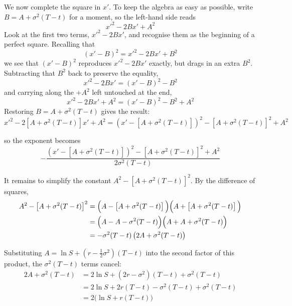 \documentclass[a4paper,12pt]{article}
\numberwithin{equation}{section}
\begin{document}
We now complete the square in $x'$. To keep the algebra as easy as possible, write
$B = A + \sigma^2(T-t)$ for a moment, so the left-hand side reads
\begin{equation}\label{eq:i1-csq-lhs}
  {x'}^2 - 2Bx' + A^2 
\end{equation}
Look at the first two terms, ${x'}^2 - 2Bx'$, and recognise them as the beginning
of a perfect square. Recalling that
\begin{equation}\label{eq:i1-csq-square}
  (x' - B)^2 = {x'}^2 - 2Bx' + B^2 
\end{equation}
we see that $(x' - B)^2$ reproduces ${x'}^2 - 2Bx'$ exactly, but drags in an extra
$B^2$. Subtracting that $B^2$ back to preserve the equality,
\begin{equation}\label{eq:i1-csq-shift}
  {x'}^2 - 2Bx' = (x' - B)^2 - B^2 
\end{equation}
and carrying along the $+A^2$ left untouched at the end,
\begin{equation}\label{eq:i1-csq-const}
  {x'}^2 - 2Bx' + A^2 = (x' - B)^2 - B^2 + A^2 
\end{equation}
Restoring $B = A + \sigma^2(T-t)$ gives the result:
\begin{equation}\label{eq:i1-csq-final}
  {x'}^2 - 2\left[A + \sigma^2(T-t)\right]x' + A^2
  = \left(x' - \left[A + \sigma^2(T-t)\right]\right)^2 - \left[A + \sigma^2(T-t)\right]^2 + A^2 
\end{equation}

so the exponent becomes
\begin{equation}\label{eq:i1-exp-6}
  -\frac{\left(x' - \left[A + \sigma^2(T-t)\right]\right)^2 - \left[A + \sigma^2(T-t)\right]^2 + A^2}{2\sigma^2(T-t)} 
\end{equation}

It remains to simplify the constant $A^2 - \left[A + \sigma^2(T-t)\right]^2$. By the
difference of squares,
\begin{align}
  A^2 - \left[A + \sigma^2(T-t)\right]^2
  &= \Big(A - \left[A + \sigma^2(T-t)\right]\Big)\Big(A + \left[A + \sigma^2(T-t)\right]\Big) \notag\\
  &= \Big(A - A - \sigma^2(T-t)\Big)\Big(A + A + \sigma^2(T-t)\Big) \notag\\
  &= -\sigma^2(T-t)\left(2A + \sigma^2(T-t)\right) 
\end{align}

Substituting $A = \ln S + \left(r - \tfrac{1}{2}\sigma^2\right)(T-t)$ into the second
factor of this product, the $\sigma^2(T-t)$ terms cancel:
\begin{equation}\label{eq:i1-const-simplify}
\begin{aligned}
  2A + \sigma^2(T-t)
  &= 2\ln S + (2r - \sigma^2)(T-t) + \sigma^2(T-t) \\
  &= 2\ln S + 2r(T-t) - \sigma^2(T-t) + \sigma^2(T-t) \\
  &= 2\big(\ln S + r(T-t)\big) 
\end{aligned}
\end{equation}
\end{document}
